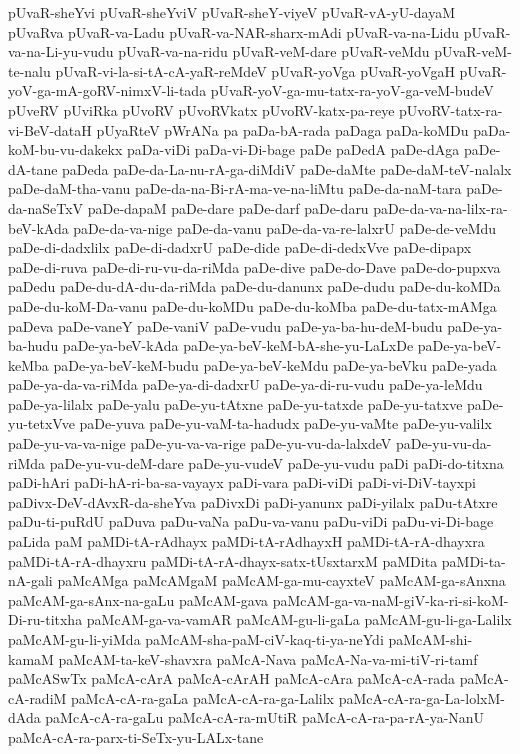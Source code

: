 {pUvaR-sheYvi
pUvaR-sheYviV
pUvaR-sheY-viyeV
pUvaR-vA-yU-dayaM
pUvaRva
pUvaR-va-Ladu
pUvaR-va-NAR-sharx-mAdi
pUvaR-va-na-Lidu
pUvaR-va-na-Li-yu-vudu
pUvaR-va-na-ridu
pUvaR-veM-dare
pUvaR-veMdu
pUvaR-veM-te-nalu
pUvaR-vi-la-si-tA-cA-yaR-reMdeV
pUvaR-yoVga
pUvaR-yoVgaH
pUvaR-yoV-ga-mA-goRV-nimxV-li-tada
pUvaR-yoV-ga-mu-tatx-ra-yoV-ga-veM-budeV
pUveRV
pUviRka
pUvoRV
pUvoRVkatx
pUvoRV-katx-pa-reye
pUvoRV-tatx-ra-vi-BeV-dataH
pUyaRteV
pWrANa
pa
paDa-bA-rada
paDaga
paDa-koMDu
paDa-koM-bu-vu-dakekx
paDa-viDi
paDa-vi-Di-bage
paDe
paDedA
paDe-dAga
paDe-dA-tane
paDeda
paDe-da-La-nu-rA-ga-diMdiV
paDe-daMte
paDe-daM-teV-nalalx
paDe-daM-tha-vanu
paDe-da-na-Bi-rA-ma-ve-na-liMtu
paDe-da-naM-tara
paDe-da-naSeTxV
paDe-dapaM
paDe-dare
paDe-darf
paDe-daru
paDe-da-va-na-lilx-ra-beV-kAda
paDe-da-va-nige
paDe-da-vanu
paDe-da-va-re-lalxrU
paDe-de-veMdu
paDe-di-dadxlilx
paDe-di-dadxrU
paDe-dide
paDe-di-dedxVve
paDe-dipapx
paDe-di-ruva
paDe-di-ru-vu-da-riMda
paDe-dive
paDe-do-Dave
paDe-do-pupxva
paDedu
paDe-du-dA-du-da-riMda
paDe-du-danunx
paDe-dudu
paDe-du-koMDa
paDe-du-koM-Da-vanu
paDe-du-koMDu
paDe-du-koMba
paDe-du-tatx-mAMga
paDeva
paDe-vaneY
paDe-vaniV
paDe-vudu
paDe-ya-ba-hu-deM-budu
paDe-ya-ba-hudu
paDe-ya-beV-kAda
paDe-ya-beV-keM-bA-she-yu-LaLxDe
paDe-ya-beV-keMba
paDe-ya-beV-keM-budu
paDe-ya-beV-keMdu
paDe-ya-beVku
paDe-yada
paDe-ya-da-va-riMda
paDe-ya-di-dadxrU
paDe-ya-di-ru-vudu
paDe-ya-leMdu
paDe-ya-lilalx
paDe-yalu
paDe-yu-tAtxne
paDe-yu-tatxde
paDe-yu-tatxve
paDe-yu-tetxVve
paDe-yuva
paDe-yu-vaM-ta-hadudx
paDe-yu-vaMte
paDe-yu-valilx
paDe-yu-va-va-nige
paDe-yu-va-va-rige
paDe-yu-vu-da-lalxdeV
paDe-yu-vu-da-riMda
paDe-yu-vu-deM-dare
paDe-yu-vudeV
paDe-yu-vudu
paDi
paDi-do-titxna
paDi-hAri
paDi-hA-ri-ba-sa-vayayx
paDi-vara
paDi-viDi
paDi-vi-DiV-tayxpi
paDivx-DeV-dAvxR-da-sheYva
paDivxDi
paDi-yanunx
paDi-yilalx
paDu-tAtxre
paDu-ti-puRdU
paDuva
paDu-vaNa
paDu-va-vanu
paDu-viDi
paDu-vi-Di-bage
paLida
paM
paMDi-tA-rAdhayx
paMDi-tA-rAdhayxH
paMDi-tA-rA-dhayxra
paMDi-tA-rA-dhayxru
paMDi-tA-rA-dhayx-satx-tUsxtarxM
paMDita
paMDi-ta-nA-gali
paMcAMga
paMcAMgaM
paMcAM-ga-mu-cayxteV
paMcAM-ga-sAnxna
paMcAM-ga-sAnx-na-gaLu
paMcAM-gava
paMcAM-ga-va-naM-giV-ka-ri-si-koM-Di-ru-titxha
paMcAM-ga-va-vamAR
paMcAM-gu-li-gaLa
paMcAM-gu-li-ga-Lalilx
paMcAM-gu-li-yiMda
paMcAM-sha-paM-ciV-kaq-ti-ya-neYdi
paMcAM-shi-kamaM
paMcAM-ta-keV-shavxra
paMcA-Nava
paMcA-Na-va-mi-tiV-ri-tamf
paMcASwTx
paMcA-cArA
paMcA-cArAH
paMcA-cAra
paMcA-cA-rada
paMcA-cA-radiM
paMcA-cA-ra-gaLa
paMcA-cA-ra-ga-Lalilx
paMcA-cA-ra-ga-La-lolxM-dAda
paMcA-cA-ra-gaLu
paMcA-cA-ra-mUtiR
paMcA-cA-ra-pa-rA-ya-NanU
paMcA-cA-ra-parx-ti-SeTx-yu-LALx-tane
}
